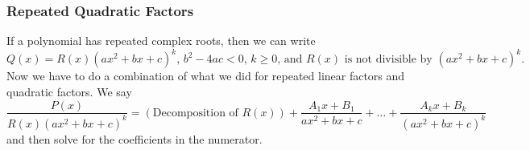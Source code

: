 \subsubsection{Repeated Quadratic Factors}

If a polynomial has repeated complex roots, then we can write
\begin{equation*}
	Q(x) = R(x)(ax^2+bx+c)^k\text{, }b^2-4ac < 0\text{, }k \geq 0\text{, and }R(x)\text{ is not divisible by }(ax^2+bx+c)^k.
\end{equation*}
Now we have to do a combination of what we did for repeated linear factors and quadratic factors. We say
\begin{equation*}
	\frac{P(x)}{R(x)(ax^2+bx+c)^k}=\left(\text{Decomposition of }R(x)\right)+\frac{A_1x+B_1}{ax^2+bx+c}+\ldots+\frac{A_kx+B_k}{(ax^2+bx+c)^k}
\end{equation*}
and then solve for the coefficients in the numerator.

